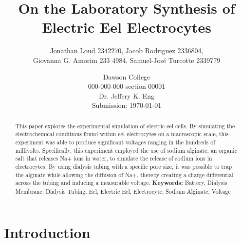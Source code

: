 \documentclass[letterpaper]{article}
\title{On the Laboratory Synthesis of Electric Eel Electrocytes}
\author{Jonathan Loud 2342270, Jacob Rodriguez 2336804, \\
Giovanna G. Amorim 233 4984, Samuel-José Turcotte 2339779}
\date{Dawson College \\[25pt]
000-000-000 section 00001\\[25pt]
Dr. Jeffery K. Eng\\[25pt]
Submission: \today}
\begin{document}
\maketitle

\begin{abstract}
    This paper explores the experimental simulation of electric eel cells. By simulating the electrochemical 
	conditions found within eel electrocytes on a macroscopic scale, this experiment was able to produce 
	significant voltages ranging in the hundreds of millivolts. Specifically, this experiment employed 
	the use of sodium alginate, an organic salt that releases Na+ ions in water, to simulate the release of sodium 
	ions in electrocytes. By using dialysis tubing with a specific pore size, it was possible to trap the alginate 
	while allowing the diffusion of Na+, thereby creating a charge differential across the tubing and inducing a measurable
	voltage.
	\noindent\textbf{Keywords:} Battery, Dialysis Membrane, Dialysis Tubing, Eel, Electric Eel, Electrocyte, Sodium Alginate, Voltage
\end{abstract}

\tableofcontents

\newpage

\section{Introduction}
\label{sec:introduction}
\end{document}
